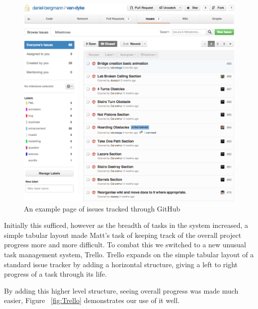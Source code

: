 \documentclass[a4paper,oneside]{memoir}
\begin{document}
		\begin{figure}[ht]
			\begin{center}
				\includegraphics[width=150mm]{../Screenshots/github-issues-home.png}
				\caption{An example page of issues tracked through GitHub}
				\label{fig:GithubIssues}
			\end{center}
		\end{figure}

		Initially this sufficed, however as the breadth of tasks in the system increased, a simple tabular layout made Matt's task of keeping track of the overall project progress more and more difficult. 
		To combat this we switched to a new unusual task management system, Trello. 
		Trello expands on the simple tabular layout of a standard issue tracker by adding a horizontal structure, giving a left to right progress of a task through its life.


		By adding this higher level structure, seeing overall progress was made much easier, Figure ~\ref{fig:Trello} demonstrates our use of it well. 
\end{document}
